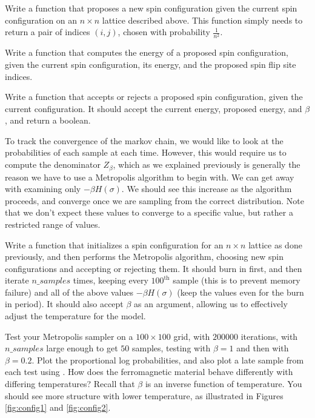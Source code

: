 \begin{problem}
Write a function that proposes a new spin configuration given the current spin configuration on an $n \times n$ lattice described above. This function simply needs to return a pair of indices $(i,j)$, chosen with probability $\frac{1}{n^{2}}$.
\end{problem}

\begin{problem}
Write a function that computes the energy of a proposed spin configuration, given the current spin configuration, its energy, and the proposed spin flip site indices.
\end{problem}

\begin{problem}
Write a function that accepts or rejects a proposed spin configuration, given the current configuration. It should accept the current energy, proposed energy, and $\beta$, and return a boolean.
\end{problem}

To track the convergence of the markov chain, we would like to look at the probabilities of each sample at each time. However, this would require us to compute the denominator $Z_{\beta}$, which as we explained previously is generally the reason we have to use a Metropolis algorithm to begin with.
We can get away with examining only $-\beta H(\sigma)$. We should see this increase as the algorithm proceeds, and converge once we are sampling from the correct distribution. Note that we don't expect these values to converge
to a specific value, but rather a restricted range of values.

\begin{problem}
Write a function that initializes a spin configuration for an $n \times n$ lattice as done previously, and then performs the Metropolis algorithm, choosing new spin configurations and accepting or rejecting them. It should burn in first, and then iterate $n\_samples$ times, keeping every $100^{\text{th}}$ sample (this is to prevent memory failure) and all of the above values $-\beta H(\sigma)$ (keep the values even for the burn in period). It should also accept $\beta$ as an argument, allowing us to effectively adjust the temperature for the model.
\end{problem}

\begin{problem}
Test your Metropolis sampler on a $100 \times 100$ grid, with $200000$ iterations, with $n\_samples$ large enough to get $50$ samples, testing with $\beta = 1$ and then with $\beta = 0.2$. Plot the proportional log probabilities, and also plot a late sample from each test using . How does the ferromagnetic material behave differently with differing temperatures? Recall that $\beta$ is an inverse function of temperature. You should see more structure with lower temperature, as illustrated in Figures \ref{fig:config1} and \ref{fig:config2}.
\end{problem}

